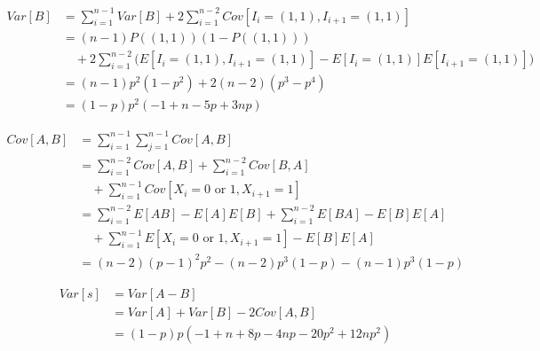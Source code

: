 \documentclass[12pt]{article}
\begin{document}
    \begin{equation*}
        \begin{split}
        Var[B]& =\sum_{i=1}^{n-1}Var[B]+2\sum_{i=1}^{n-2}Cov[I_i=(1,1),I_{i+1}=
                (1,1)] \\
              & =(n-1)P((1, 1))(1-P((1, 1))) \\
              & \quad +2\sum_{i=1}^{n-2}\bigg(E[I_i=(1,1),I_{i+1}=(1,1)]-E[I_i=
                (1,1)]E[I_{i+1}=(1,1)]\bigg) \\
              & =(n-1)p^2(1-p^2)+2(n-2)(p^3-p^4) \\
              & =(1-p)p^2(-1+n-5p+3np)
        \end{split}
    \end{equation*}

    \begin{equation*}
        \begin{split}
        Cov[A,B]& =\sum_{i=1}^{n-1}\sum_{j=1}^{n-1}Cov[A,B] \\
                & =\sum_{i=1}^{n-2}Cov[A,B]+\sum_{i=1}^{n-2}Cov[B,A] \\
                & \quad +\sum_{i=1}^{n-1}Cov[X_i=0\text{ or }1,X_{i+1}=1] \\
                & =\sum_{i=1}^{n-2}E[AB]-E[A]E[B]+\sum_{i=1}^{n-2}E[BA]-
                  E[B]E[A] \\
                & \quad +\sum_{i=1}^{n-1}E[X_i=0\text{ or }1,X_{i+1}=1]-
                  E[B]E[A] \\
                & =(n-2)(p-1)^2p^2-(n-2)p^3(1-p)-(n-1)p^3(1-p)
        \end{split}
    \end{equation*}

    \begin{equation*}
        \begin{split}
        Var[s]& =Var[A-B] \\
                    & =Var[A]+Var[B]-2Cov[A,B] \\
                    & =(1-p)p(-1+n+8p-4np-20p^2+12np^2)
        \end{split}
    \end{equation*}
\end{document}
